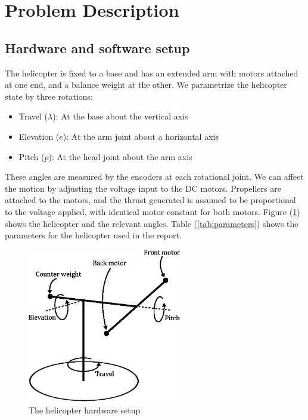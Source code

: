 \section{Problem Description}\label{sec:prob_descr}

\subsection{Hardware and software setup}
The helicopter is fixed to a base and has an extended arm with motors attached at one end,
and a balance weight at the other. We parametrize the helicopter state by three rotations:
\begin{itemize}
    \item Travel ($\lambda$): At the base about the vertical axis
    \item Elevation ($e$): At the arm joint about a horizontal axis
    \item Pitch ($p$): At the head joint about the arm axis
\end{itemize}
These angles are measured by the encoders at each rotational joint. We can affect the motion by adjusting the voltage input to the DC motors. Propellers are attached to the motors, and the thrust generated is assumed to be proportional to the voltage applied, with identical motor constant for both motors. Figure (\ref{fig:hardware}) shows the helicopter and the relevant angles. Table (\ref{tab:parameters}) shows the parameters for the helicopter used in the report.

\begin{figure}[htb]
	\centering
	\includegraphics[width = 0.6\textwidth]{figures/hardware_setup.eps}
	\caption{The helicopter hardware setup}
	\label{fig:hardware}
\end{figure}


